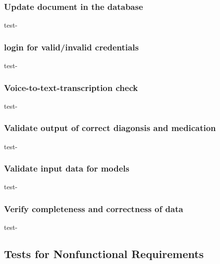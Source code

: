 \documentclass[12pt, titlepage]{article}
\begin{document}
\subsubsection{Update document in the database} \label{section:4.1.3}

\item{test-} \label{test-}


\subsubsection{login for valid/invalid credentials} \label{section:4.1.4}

\item{test-} \label{test-}


\subsubsection{Voice-to-text-transcription check} \label{section:4.1.5}

\item{test-} \label{test-}


\subsubsection{Validate output of correct diagonsis and medication} \label{section:4.1.6}

\item{test-} \label{test-}


\subsubsection{Validate input data for models} \label{section:4.1.7}

\item{test-} \label{test-}


\subsubsection{Verify completeness and correctness of data} \label{section:4.1.8}

\item{test-} \label{test-}




\subsection{Tests for Nonfunctional Requirements} \label{section:4.2}
\end{document}
